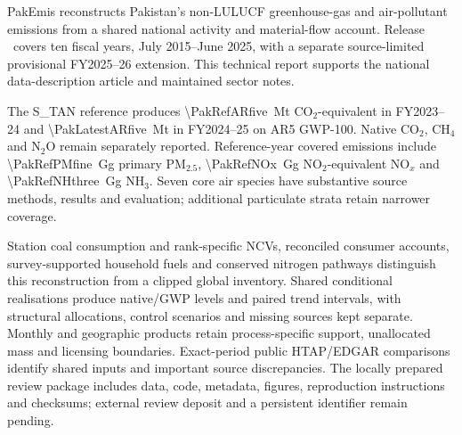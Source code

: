 PakEmis reconstructs Pakistan's non-LULUCF greenhouse-gas and air-pollutant emissions from a shared national activity and material-flow account. Release \PakEmisRelease\ covers ten fiscal years, July 2015--June 2025, with a separate source-limited provisional FY2025--26 extension. This technical report supports the national data-description article and maintained sector notes.

The S\_TAN reference produces \SI{\PakRefARfive}{\mega\tonne} CO$_2$-equivalent in FY2023--24 and \SI{\PakLatestARfive}{\mega\tonne} in FY2024--25 on AR5 GWP-100. Native CO$_2$, CH$_4$ and N$_2$O remain separately reported. Reference-year covered emissions include \SI{\PakRefPMfine}{\giga\gram} primary PM$_{2.5}$, \SI{\PakRefNOx}{\giga\gram} NO$_2$-equivalent NO$_x$ and \SI{\PakRefNHthree}{\giga\gram} NH$_3$. Seven core air species have substantive source methods, results and evaluation; additional particulate strata retain narrower coverage.

Station coal consumption and rank-specific NCVs, reconciled consumer accounts, survey-supported household fuels and conserved nitrogen pathways distinguish this reconstruction from a clipped global inventory. Shared conditional realisations produce native/GWP levels and paired trend intervals, with structural allocations, control scenarios and missing sources kept separate. Monthly and geographic products retain process-specific support, unallocated mass and licensing boundaries. Exact-period public HTAP/EDGAR comparisons identify shared inputs and important source discrepancies. The locally prepared review package includes data, code, metadata, figures, reproduction instructions and checksums; external review deposit and a persistent identifier remain pending.

